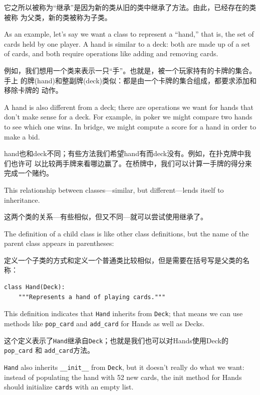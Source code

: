 \documentclass[10pt]{book}
\begin{document}
\begin{CJK}{UTF8}{gbsn}
它之所以被称为``继承''是因为新的类从旧的类中继承了方法。由此，已经存在的类被称
为父类，新的类被称为子类。

As an example, let's say we want a class to represent a ``hand,''
that is, the set of cards held by one player.  A hand is similar to a
deck: both are made up of a set of cards, and both require operations
like adding and removing cards.

例如，我们想用一个类来表示一只``手''。也就是，被一个玩家持有的卡牌的集合。手上
的牌(hand)和整副牌(deck)类似：都是由一个卡牌的集合组成，都要求添加和移除卡牌的
动作。

A hand is also different from a deck; there are operations we want for
hands that don't make sense for a deck.  For example, in poker we
might compare two hands to see which one wins.  In bridge, we might
compute a score for a hand in order to make a bid.

hand也和deck不同；有些方法我们希望hand有而deck没有。例如，在扑克牌中我们也许可
以比较两手牌来看哪边赢了。在桥牌中，我们可以计算一手牌的得分来完成一个赌约。

This relationship between classes---similar, but different---lends
itself to inheritance.  

这两个类的关系---有些相似，但又不同---就可以尝试使用继承了。

The definition of a child class is like other class definitions,
but the name of the parent class appears in parentheses:

定义一个子类的方式和定义一个普通类比较相似，但是需要在括号写是父类的名称：

\begin{verbatim}
class Hand(Deck):
    """Represents a hand of playing cards."""
\end{verbatim}
%
This definition indicates that {\tt Hand} inherits from {\tt Deck};
that means we can use methods like \verb"pop_card" and \verb"add_card"
for Hands as well as Decks.

这个定义表示了{\tt Hand}继承自{\tt Deck}；也就是我们也可以对Hands使用Deck的
\verb"pop_card" 和 \verb"add_card"方法。

{\tt Hand} also inherits \verb"__init__" from {\tt Deck}, but
it doesn't really do what we want: instead of populating the hand
with 52 new cards, the init method for Hands should initialize
{\tt cards} with an empty list.


\end{CJK}
\end{document}
